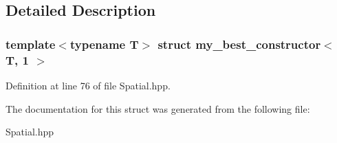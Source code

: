 \subsection{Detailed Description}
\subsubsection*{template$<$typename T$>$\newline
struct my\+\_\+best\+\_\+constructor$<$ T, 1 $>$}



Definition at line 76 of file Spatial.\+hpp.



The documentation for this struct was generated from the following file\+:\begin{DoxyCompactItemize}
\item 
Spatial.\+hpp\end{DoxyCompactItemize}

